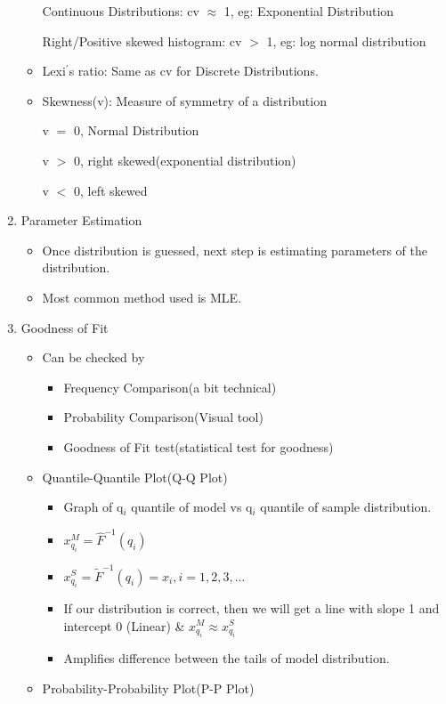 \documentclass[a4paper]{article}
\begin{document}
\begin{enumerate}
\begin{itemize}
			Continuous Distributions: cv $\approx$ 1, eg: Exponential Distribution
			
			Right/Positive skewed histogram: cv $>$ 1, eg: log normal distribution
			\item Lexi$^{'}$s ratio: Same as cv for Discrete Distributions.
			\item Skewness(v): Measure of symmetry of a distribution
			
			v $=$ 0, Normal Distribution
			
			v $>$ 0, right skewed(exponential distribution)
			
			v $<$ 0, left skewed 
		\end{itemize}
		\item Parameter Estimation
		\begin{itemize}
			\item Once distribution is guessed, next step is estimating parameters of the distribution.
			\item Most common method used is MLE.
		\end{itemize}
		\item Goodness of Fit
		\begin{itemize}
			\item Can be checked by
			\begin{itemize}
				\item Frequency Comparison(a bit technical)
				\item Probability Comparison(Visual tool)
				\item Goodness of Fit test(statistical test for goodness) 
			\end{itemize}
			\item Quantile-Quantile Plot(Q-Q Plot)
			\begin{itemize}
				\item Graph of q$_{i}$ quantile of model vs q$_{i}$ quantile of sample distribution.
				\item $x_{q_{i}}^{M} = \hat{F}^{-1}(q_{i})$
				\item $x_{q_{i}}^{S} = \tilde{F}^{-1}(q_{i}) = x_{i}, i = 1,2,3,...$
				\item If our distribution is correct, then we will get a line with slope 1 and intercept 0 (Linear) \& $x_{q_{i}}^{M} \approx x_{q_{i}}^{S}$
				\item Amplifies difference between the tails of model distribution.\\
			\end{itemize}
			\item Probability-Probability Plot(P-P Plot)

\end{itemize}
\end{enumerate}
\end{document}
